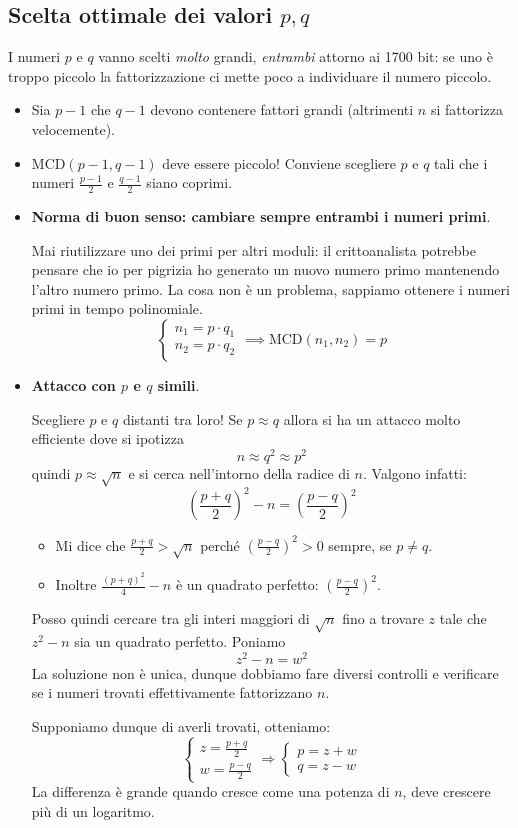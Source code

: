 \subsection{Scelta ottimale dei valori $p,q$}
I numeri $p$ e $q$ vanno scelti \emph{molto} grandi, \emph{entrambi} attorno ai 1700 bit: se uno è troppo piccolo la fattorizzazione ci mette poco a individuare il numero piccolo.
\begin{itemize}
	\item Sia $p-1$ che $q-1$ devono contenere fattori grandi (altrimenti $n$ si fattorizza velocemente).
	\item $\text{MCD}(p-1, q-1)$ deve essere piccolo! Conviene scegliere $p$ e $q$ tali che i numeri $\frac{p-1}{2}$ e $\frac{q-1}{2}$ siano coprimi.
	\item \textbf{Norma di buon senso: cambiare sempre entrambi i numeri primi}.
	
	Mai riutilizzare uno dei primi per altri moduli: il crittoanalista potrebbe pensare che io per pigrizia ho generato un nuovo numero primo mantenendo l'altro numero primo. La cosa non è un problema, sappiamo ottenere i numeri primi in tempo polinomiale.
	\[\begin{cases}
			n_1 = p \cdot q_1 \\
			n_2 = p \cdot q_2
		\end{cases}
		\implies \text{MCD}(n_1, n_2) = p
	\]

\item \textbf{Attacco con $p$ e $q$ simili}.

Scegliere $p$ e $q$ distanti tra loro! Se $p \approx q$ allora si ha un attacco molto efficiente dove si ipotizza $$n \approx q^2 \approx p^2$$
quindi $p \approx \sqrt{n}$ e si cerca nell'intorno della radice di $n$. Valgono infatti:
$$ \left(\frac{p+q}{2}\right)^2 -n = \left(\frac{p-q}{2}\right)^2 $$
\begin{itemize}
	\item Mi dice che $\frac{p+q}{2} > \sqrt{n}$ perché $\left(\frac{p-q}{2}\right)^2> 0$ sempre, se $p \neq q$.
	
	\item Inoltre $\frac{(p+q)^2}{4}-n$ è un quadrato perfetto: $(\frac{p-q}{2})^2$.
\end{itemize}
Posso quindi cercare tra gli interi maggiori di $\sqrt{n}$ fino a trovare $z$ tale che $z^2 - n$ sia un quadrato perfetto. Poniamo
$$z^2-n=w^2$$
La soluzione non è unica, dunque dobbiamo fare diversi controlli e verificare se i numeri trovati effettivamente fattorizzano $n$.

Supponiamo dunque di averli trovati, otteniamo: 
\[
	\begin{cases}
		z = \frac{p+q}{2} \\
		w = \frac{p-q}{2}
	\end{cases}
	\Longrightarrow 
	\begin{cases}
		p = z+w \\
		q = z-w
	\end{cases}
\]
La differenza è grande quando cresce come una potenza di $n$, deve crescere più di un logaritmo.
\end{itemize}


